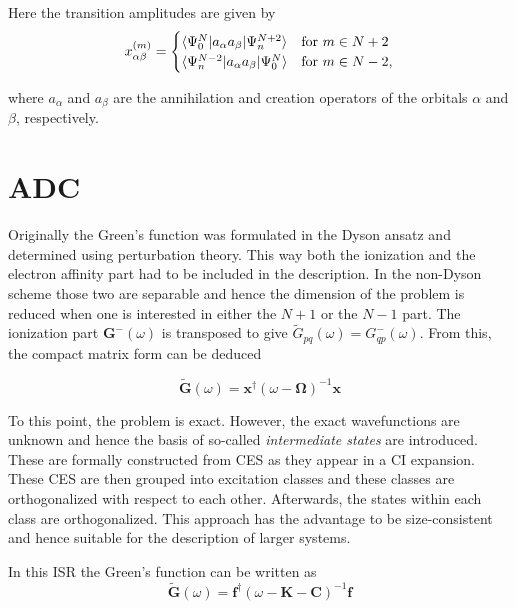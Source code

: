 Here the transition amplitudes are given by
\begin{equation}
x^{(m)}_{\alpha\beta}=\begin{cases}
\braket{\Psi_0^N|a_\alpha a_\beta|\Psi_n^{N+2}} & \text{for } m\in N+2\\
\braket{\Psi_n^{N-2}|a_\alpha a_\beta|\Psi_0^{N}} & \text{for } m\in N-2,
\end{cases}
\end{equation}

where $a_\alpha$ and $a_\beta$ are the annihilation and creation operators of
the orbitals $\alpha$ and $\beta$, respectively.



\section{\acl{ADC}}
Originally the Green's function was formulated in the Dyson ansatz and
determined using perturbation theory. This way both the ionization and the
electron affinity part had to be included in the description. In the non-Dyson
scheme those two are separable and hence the dimension of the problem is reduced
when one is interested in either the $N+1$ or the $N-1$ part. \cite{Schirmer98}
The ionization part $\mathbf{G^-}(\omega)$ is transposed to give
$\tilde{G}_{pq}(\omega) = G^-_{qp}(\omega)$. From this, the compact matrix
form can be deduced

\begin{equation}\label{matrixspec}
\mathbf{\tilde{G}}(\omega) = \mathbf{x}^\dagger(\omega-\mathbf{\Omega})^{-1}\mathbf{x}
\end{equation}

To this point, the problem is exact. However, the exact wavefunctions are unknown
and hence the basis of so-called \emph{intermediate states} are introduced. These
are formally constructed from \ac{CES} as they appear in a
\ac{CI} expansion. These \ac{CES} are then grouped into excitation classes
and these classes are orthogonalized with respect to each other. Afterwards,
the states within each class are orthogonalized. 
This approach has the advantage to be size-consistent and hence
suitable for the description of larger systems. \cite{Mertins96_1}

In this \ac{ISR} the Green's function can be written as
\begin{equation}\label{isradc}
\mathbf{\tilde{G}}(\omega) = \mathbf{f}^\dagger(\omega-\mathbf{K}-\mathbf{C})^{-1}\mathbf{f}
\end{equation}

